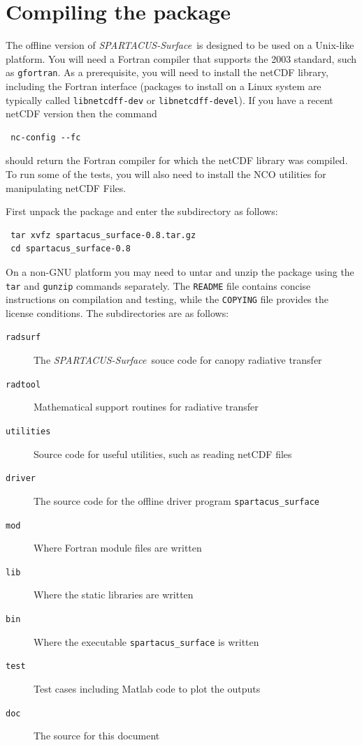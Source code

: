 \documentclass[a4,oneside]{article}
\def\codesize{\small}
\def\spsurf{\emph{SPARTACUS-Surface}}
\def\code#1{{\codesize\texttt{#1}}}
\def\citem#1{\item[{\codesize\texttt{#1}}]}
\def\chapter{\section}
\begin{document}

\section{Compiling the package}
\label{sec:compile}
The offline version of \spsurf\ is designed to be used on a Unix-like
platform. You will need a Fortran compiler that supports the 2003
standard, such as \code{gfortran}.
%
As a prerequisite, you will need to install the netCDF library,
including the Fortran interface (packages to install on a Linux system
are typically called \code{libnetcdff-dev} or
\code{libnetcdff-devel}).  If you have a recent netCDF version then
the command
\begin{lstlisting}
 nc-config --fc
\end{lstlisting}
should return the Fortran compiler for which the netCDF library was
compiled.  To run some of the tests, you will also need to install the
NCO utilities for manipulating netCDF Files.

First unpack the package and enter the subdirectory as follows:
\begin{lstlisting}
 tar xvfz spartacus_surface-0.8.tar.gz
 cd spartacus_surface-0.8
\end{lstlisting}
On a non-GNU platform you may need to untar and unzip the package
using the \code{tar} and \code{gunzip} commands separately. The
\code{README} file contains concise instructions on compilation and
testing, while the \code{COPYING} file provides the license conditions.
The subdirectories are as follows:
%
\begin{description}
\citem{radsurf} The \spsurf\ souce code for canopy radiative transfer
\citem{radtool} Mathematical support routines for radiative transfer
\citem{utilities} Source code for useful utilities, such as reading netCDF
       files
\citem{driver} The source code for the offline driver program \code{spartacus\_surface}
\citem{mod} Where Fortran module files are written
\citem{lib} Where the static libraries are written
\citem{bin} Where the executable \code{spartacus\_surface} is written
\citem{test} Test cases including Matlab code to plot the outputs
\citem{doc} The source for this document
\end{description}
\end{document}
